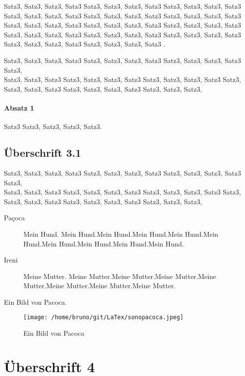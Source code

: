     Satz3, Satz3, Satz3, Satz3 Satz3, Satz3, Satz3, Satz3 Satz3, Satz3, Satz3, Satz3 Satz3, Satz3, Satz3, Satz3 Satz3, Satz3, Satz3, Satz3 
    Satz3, Satz3, Satz3, Satz3 Satz3, Satz3, Satz3, Satz3 Satz3, Satz3, Satz3, Satz3 Satz3, Satz3, Satz3, Satz3 Satz3, Satz3, Satz3, Satz3 
    Satz3, Satz3, Satz3, Satz3 Satz3, Satz3, Satz3, Satz3 Satz3, Satz3, Satz3, Satz3 Satz3, Satz3, Satz3, Satz3 .


    Satz3, Satz3, Satz3, Satz3 Satz3, Satz3, Satz3, Satz3 Satz3, Satz3, Satz3, Satz3 Satz3, \\
    Satz3, Satz3, Satz3 Satz3, Satz3, Satz3, Satz3 
    Satz3, Satz3, Satz3, Satz3 Satz3, Satz3, Satz3, Satz3 Satz3, Satz3, Satz3, Satz3 Satz3, Satz3, Satz3,
    
    \paragraph*{Absatz 1}
    Satz3 Satz3, Satz3, Satz3, Satz3.

    \subsection{Überschrift 3.1}
    Satz3, Satz3, Satz3, Satz3 Satz3, Satz3, Satz3, Satz3 Satz3, Satz3, Satz3, Satz3 Satz3, \\
    Satz3, Satz3, Satz3 Satz3, Satz3, Satz3, Satz3 
    Satz3, Satz3, Satz3, Satz3 Satz3, Satz3, Satz3, Satz3 Satz3, Satz3, Satz3, Satz3 Satz3, Satz3, Satz3,

    \begin{description}
        \item [Paçoca] Mein Hund. Mein Hund.Mein Hund.Mein Hund.Mein Hund.Mein Hund.Mein Hund.Mein Hund.Mein Hund.Mein Hund.
        \item [Ireni] Meine Mutter. Meine Mutter.Meine Mutter.Meine Mutter.Meine Mutter.Meine Mutter.Meine Mutter.Meine Mutter.
    \end{description}


    Ein Bild von Pacoca.
    \begin{figure}[htb]
        \centering
        \texttt{[image: /home/bruno/git/LaTex/sonopacoca.jpeg]}
        \caption{Ein Bild von Pacoca}
        \label{fig:pacoca}
    \end{figure}

    \section{Überschrift 4}

